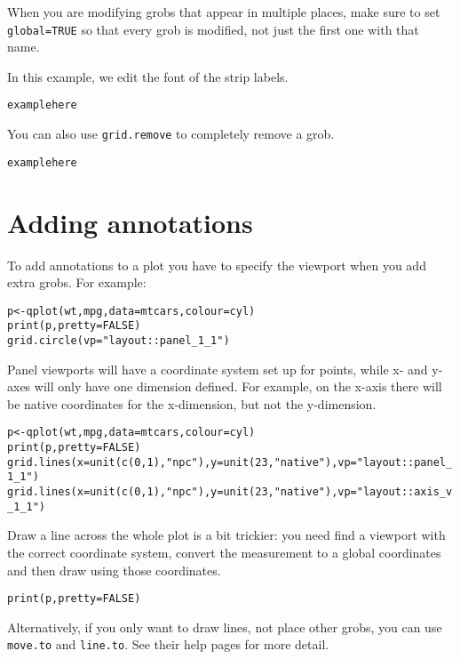 When you are modifying grobs that appear in multiple places, make sure to set {\tt global=TRUE} so that every grob is modified, not just the first one with that name.

In this example, we edit the font of the strip labels.

\begin{alltt}
example here
\end{alltt}

You can also use {\tt grid.remove} to completely remove a grob.

\begin{alltt}
example here
\end{alltt}

\section{Adding annotations}\label{sec:adding_annotation}

To add annotations to a plot you have to specify the viewport when you add extra grobs.  For example:

\begin{alltt}
p <- qplot(wt, mpg, data=mtcars, colour=cyl)
print(p, pretty=FALSE)
grid.circle(vp="layout::panel_1_1")
\end{alltt}

Panel viewports will have a coordinate system set up for points, while x- and y- axes will only have one dimension defined.  For example, on the x-axis there will be native coordinates for the x-dimension, but not the y-dimension.

\begin{alltt}
p <- qplot(wt, mpg, data=mtcars, colour=cyl)
print(p, pretty=FALSE)
grid.lines(x=unit(c(0,1), "npc"), y=unit(23, "native"), vp="layout::panel_1_1")
grid.lines(x=unit(c(0,1), "npc"), y=unit(23, "native"), vp="layout::axis_v_1_1")
\end{alltt}

Draw a line across the whole plot is a bit trickier: you need find a viewport with the correct coordinate system, convert the measurement to a global coordinates and then draw using those coordinates.

\begin{alltt}
print(p, pretty=FALSE)
\end{alltt}

Alternatively, if you only want to draw lines, not place other grobs, you can use {\tt move.to} and {\tt line.to}.  See their help pages for more detail.

